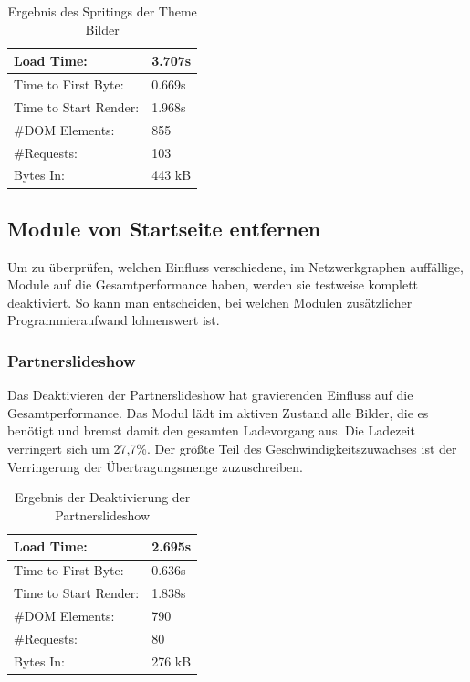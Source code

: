 \begin{table}[!ht]
\centering
\caption{Ergebnis des Spritings der Theme Bilder}
    \begin{tabular}{ | p{3cm} | p{1.5cm} | }
    \hline
    Load Time: 			& 3.707s 	\\ \hline
    Time to First Byte:		& 0.669s  	\\ \hline
    Time to Start Render:	& 1.968s	\\ \hline
    \#DOM Elements:		& 855 		\\ \hline
    \#Requests:			& 103 		\\ \hline
    Bytes In:			& 443 kB 	\\ \hline
    \hline
    \end{tabular}
\end{table}

\subsection{Module von Startseite entfernen}
Um zu überprüfen, welchen Einfluss verschiedene, im Netzwerkgraphen auffällige, Module auf die Gesamtperformance haben, werden sie testweise komplett deaktiviert. So kann man entscheiden, bei welchen Modulen zusätzlicher Programmieraufwand lohnenswert ist.
\subsubsection{Partnerslideshow} Das Deaktivieren der Partnerslideshow hat gravierenden Einfluss auf die Gesamtperformance. Das Modul lädt im aktiven Zustand alle Bilder, die es benötigt und bremst damit den gesamten Ladevorgang aus. Die Ladezeit verringert sich um 27,7\%. Der größte Teil des Geschwindigkeitszuwachses ist der Verringerung der Übertragungsmenge zuzuschreiben. 

\begin{table}[!ht]
\centering
\caption{Ergebnis der Deaktivierung der Partnerslideshow}
    \begin{tabular}{ | p{3cm} | p{1.5cm} | }
    \hline
    Load Time: 			& 2.695s 	\\ \hline
    Time to First Byte:		& 0.636s  	\\ \hline
    Time to Start Render:	& 1.838s	\\ \hline
    \#DOM Elements:		& 790 		\\ \hline
    \#Requests:			& 80 		\\ \hline
    Bytes In:			& 276 kB 	\\ \hline
    \hline
    \end{tabular}
\end{table}

